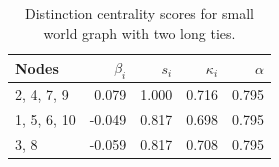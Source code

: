 \begin{table}
\centering
\caption{\label{tab:sw2}Distinction centrality scores for small world graph with two long ties.}
\centering
\begin{tabular}[t]{lrrrr}
\toprule
Nodes & $\beta_i$ & $s_i$ & $\kappa_i$ & $\alpha$\\
\midrule
2, 4, 7, 9 & 0.079 & 1.000 & 0.716 & 0.795\\
1, 5, 6, 10 & -0.049 & 0.817 & 0.698 & 0.795\\
3, 8 & -0.059 & 0.817 & 0.708 & 0.795\\
\bottomrule
\end{tabular}
\end{table}
